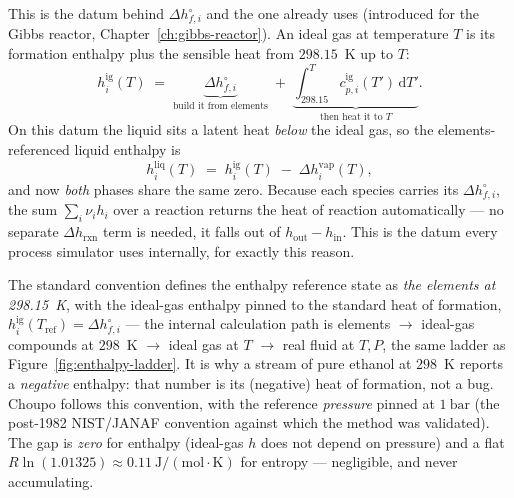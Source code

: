 \documentclass[11pt,a4paper]{article}
\begin{document}
This is the datum behind $\Delta h^{\circ}_{f,i}$ and the one
 already uses (introduced for the Gibbs
reactor, Chapter~\ref{ch:gibbs-reactor}).  An ideal gas at temperature
$T$ is its formation enthalpy plus the sensible heat from $298.15$~K up
to $T$:
\begin{equation}
   h^{\mathrm{ig}}_i(T) \;=\; \underbrace{\Delta h^{\circ}_{f,i}}_{\text{build it from elements}}
       \;+\; \underbrace{\int_{298.15}^{T} c_{p,i}^{\mathrm{ig}}(T')\,\mathrm{d}T'}_{\text{then heat it to }T}.
\end{equation}
On this datum the liquid sits a latent heat \emph{below} the ideal gas,
so the elements-referenced liquid enthalpy is
\begin{equation}
   \boxed{\;
   h^{\mathrm{liq}}_i(T) \;=\; h^{\mathrm{ig}}_i(T)
       \;-\; \Delta h^{\mathrm{vap}}_i(T),
   \;}
\end{equation}
and now \emph{both} phases share the same zero.  Because each species
carries its $\Delta h^{\circ}_{f,i}$, the sum $\sum_i \nu_i h_i$ over a
reaction returns the heat of reaction automatically --- no separate
$\Delta h_{\mathrm{rxn}}$ term is needed, it falls out of
$h_{\mathrm{out}} - h_{\mathrm{in}}$.  This is the datum every
process simulator uses internally, for exactly this reason.

\begin{intuition}
The standard convention defines the enthalpy reference state as
\emph{the elements at 298.15~K}, with the ideal-gas enthalpy pinned to
the standard heat of formation, $h^{\mathrm{ig}}_i(T_{\mathrm{ref}}) =
\Delta h^{\circ}_{f,i}$ --- the internal calculation path is
elements $\to$ ideal-gas compounds at $298$~K $\to$ ideal gas at $T$
$\to$ real fluid at $T,P$, the same ladder as
Figure~\ref{fig:enthalpy-ladder}.  It is why a stream of pure
ethanol at $298$~K reports a \emph{negative} enthalpy: that number is
its (negative) heat of formation, not a bug.  Choupo follows this
convention, with the reference \emph{pressure} pinned at
$1~\mathrm{bar}$ (the post-1982 NIST/JANAF convention against which the
 method was validated).  The gap is \emph{zero} for enthalpy
(ideal-gas $h$ does not depend on pressure) and a flat
$R\ln(1.01325)\approx 0.11~\mathrm{J/(mol\cdot K)}$ for entropy ---
negligible, and never accumulating.
\end{intuition}
\end{document}
